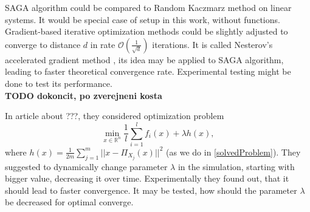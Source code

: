 \documentclass[11pt]{book}
\newcommand{\R}{\mathbb{R}}
\begin{document}
SAGA algorithm could be compared to Random Kaczmarz method on linear systems. It would be special case of setup in this work, without functions.\\

Gradient-based iterative optimization methods could be slightly adjusted to converge to distance $d$ in rate $\mathcal{O}(\frac{1}{\sqrt{d}})$ iterations. It is called Nesterov's accelerated gradient method \cite{acceleration}, its idea may be applied to SAGA algorithm, leading to faster theoretical convergence rate. Experimental testing might be done to test its performance.\\

\textbf{TODO dokoncit, po zverejneni kosta}

In article \cite{kosto} about ???, they considered optimization problem $$ \min_{x \in \R^n} \frac{1}{l}\sum_{i=1}^l f_i(x) + \lambda h(x),$$ where $h(x)=\frac{1}{2m}\sum_{j=1}^m ||x-\Pi_{X_j}(x)||^2$ (as we do in \ref{solvedProblem}). They suggested to dynamically change parameter $\lambda$ in the simulation, starting with bigger value, decreasing it over time. Experimentally they found out, that it should lead to faster convergence. It may be tested, how should the parameter $\lambda$ be decreased for optimal converge.





\end{document}
